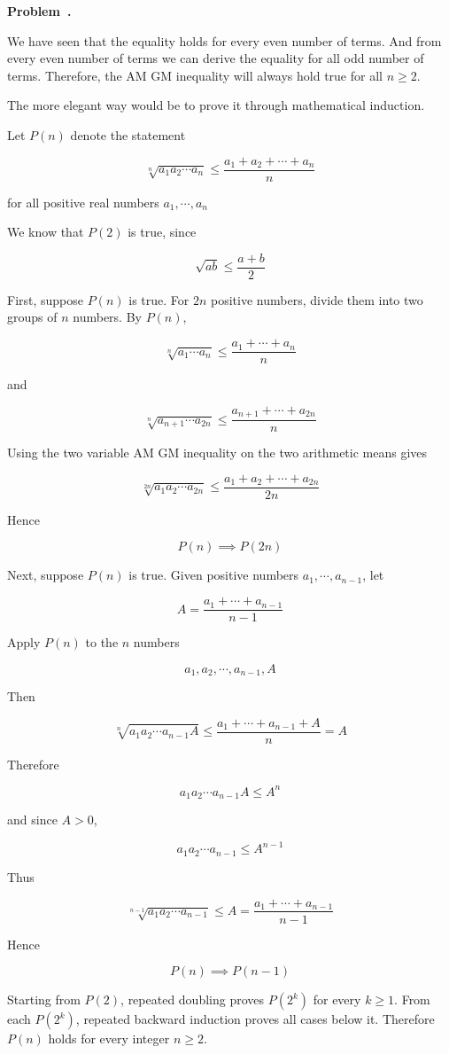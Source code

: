 \documentclass[10pt]{article}
\newcounter{problem}
\newenvironment{problem}[1][]{
  \refstepcounter{problem}
  \par\noindent\textbf{Problem~\theproblem. #1}\par
  \vspace{0.5em}
}{\vspace{1em}}
\begin{document}
\begin{problem} %
We have seen that the equality holds for every even number of terms. And from every even number of terms we can derive the equality for all 
odd number of terms. Therefore, the AM GM inequality will always hold true for all $n \ge 2$.

The more elegant way would be to prove it through mathematical induction.

Let $P(n)$ denote the statement

\[
\sqrt[n]{a_1 a_2 \cdots a_n} \le \dfrac{a_1 + a_2 + \cdots + a_n}{n}
\]

for all positive real numbers $a_1, \cdots ,a_n$

We know that \(P(2)\) is true, since

\[
\sqrt{ab} \le \dfrac{a + b}{2}
\]

First, suppose $P(n)$ is true. For $2n$ positive numbers, divide them into two groups of $n$ numbers. By $P(n)$,

\[
\sqrt[n]{a_1 \cdots a_n} \le \dfrac{a_1 + \cdots + a_n}{n}
\]

and

\[
\sqrt[n]{a_{n + 1} \cdots a_{2n}} \le \dfrac{a_{n + 1} + \cdots + a_{2n}}{n}
\]

Using the two variable AM GM inequality on the two arithmetic means gives

\[
\sqrt[2n]{a_1 a_2 \cdots a_{2n}} \le \dfrac{a_1 + a_2 + \cdots + a_{2n}}{2n}
\]

Hence

\[
P(n)\implies P(2n)
\]

Next, suppose $P(n)$ is true. Given positive numbers
$a_1, \cdots ,a_{n-1}$, let

\[
A = \dfrac{a_1 + \cdots + a_{n - 1}}{n - 1}
\]

Apply $P(n)$ to the $n$ numbers

\[
a_1, a_2, \cdots , a_{n - 1}, A
\]

Then

\[
\sqrt[n]{a_1 a_2 \cdots a_{n - 1} A} \le \dfrac{a_1 + \cdots + a_{n - 1} + A}{n} = A
\]

Therefore

\[
a_1 a_2 \cdots a_{n - 1}A \le A^n
\]

and since $A>0$,

\[
a_1 a_2 \cdots a_{n - 1} \le A^{n- 1}
\]

Thus

\[
\sqrt[n - 1]{a_1 a_2 \cdots a_{n - 1}} \le A = \dfrac{a_1 + \cdots +a_{n - 1}}{n - 1}
\]

Hence

\[
P(n) \implies P(n-1)
\]

Starting from $P(2)$, repeated doubling proves $P(2^k)$ for every $k \ge 1$. From each $P(2^k)$, repeated backward induction proves all
cases below it. Therefore $P(n)$ holds for every integer $n \ge2$.  
\end{problem}
\end{document}
